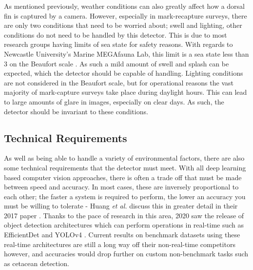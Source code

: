  As mentioned previously, weather conditions can also greatly affect how a dorsal fin is captured by a camera. However, especially in mark-recapture surveys, there are only two conditions that need to be worried about; swell and lighting, other conditions do not need to be handled by this detector. This is due to most research groups having limits of sea state for safety reasons. With regards to Newcastle University's Marine MEGAfauna Lab, this limit is a sea state less than 3 on the Beaufort scale \cite{world_meteorologicial_society_beaufort_1970}. As such a mild amount of swell and splash can be expected, which the detector should be capable of handling. Lighting conditions are not considered in the Beaufort scale, but for operational reasons the vast majority of mark-capture surveys take place during daylight hours. This can lead to large amounts of glare in images, especially on clear days. As such, the detector should be invariant to these conditions. 
 
 \subsection{Technical Requirements}\label{ch:cetDet,sec:requirements,sub:technical}
 
 As well as being able to handle a variety of environmental factors, there are also some technical requirements that the detector must meet. With all deep learning based computer vision approaches, there is often a trade off that must be made between speed and accuracy. In most cases, these are inversely proportional to each other; the faster a system is required to perform, the lower an accuracy you must be willing to tolerate - Huang \textit{et al.} discuss this in greater detail in their 2017 paper \cite{huang_speedaccuracy_2017}. Thanks to the pace of research in this area, 2020 saw the release of object detection architectures which can perform operations in real-time such as EfficientDet \cite{tan_efficientdet_2020} and YOLOv4 \cite{bochkovskiy_yolov4_2020}. Current results on benchmark datasets using these real-time architectures are still a long way off their non-real-time competitors however, and accuracies would drop further on custom non-benchmark tasks such as cetacean detection. 
 
